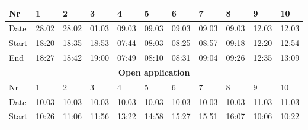 \begin{table}[H]
\begin{tabular}{|lllllllllll|}
\multicolumn{1}{|l|}{Nr} & \multicolumn{1}{l|}{1}     & \multicolumn{1}{l|}{2}     & \multicolumn{1}{l|}{3}     & \multicolumn{1}{l|}{4}     & \multicolumn{1}{l|}{5}     & \multicolumn{1}{l|}{6}     & \multicolumn{1}{l|}{7}     & \multicolumn{1}{l|}{8}     & \multicolumn{1}{l|}{9}     & 10    \\ \hline
\multicolumn{1}{|l|}{Date}   & \multicolumn{1}{l|}{28.02} & \multicolumn{1}{l|}{28.02} & \multicolumn{1}{l|}{01.03} & \multicolumn{1}{l|}{09.03} & \multicolumn{1}{l|}{09.03} & \multicolumn{1}{l|}{09.03} & \multicolumn{1}{l|}{09.03} & \multicolumn{1}{l|}{09.03} & \multicolumn{1}{l|}{12.03} & 12.03 \\ \hline
\multicolumn{1}{|l|}{Start}  & \multicolumn{1}{l|}{18:20} & \multicolumn{1}{l|}{18:35} & \multicolumn{1}{l|}{18:53} & \multicolumn{1}{l|}{07:44} & \multicolumn{1}{l|}{08:03} & \multicolumn{1}{l|}{08:25} & \multicolumn{1}{l|}{08:57} & \multicolumn{1}{l|}{09:18} & \multicolumn{1}{l|}{12:20} & 12:54 \\ \hline
\multicolumn{1}{|l|}{End}    & \multicolumn{1}{l|}{18:27} & \multicolumn{1}{l|}{18:42} & \multicolumn{1}{l|}{19:00} & \multicolumn{1}{l|}{07:49} & \multicolumn{1}{l|}{08:10} & \multicolumn{1}{l|}{08:31} & \multicolumn{1}{l|}{09:04} & \multicolumn{1}{l|}{09:26} & \multicolumn{1}{l|}{12:35} & 13:09 \\ \hline
\multicolumn{11}{|c|}{\textbf{Open application}}                                                                                                                                                                                                                                                          \\ \hline
\multicolumn{1}{|l|}{Nr} & \multicolumn{1}{l|}{1}     & \multicolumn{1}{l|}{2}     & \multicolumn{1}{l|}{3}     & \multicolumn{1}{l|}{4}     & \multicolumn{1}{l|}{5}     & \multicolumn{1}{l|}{6}     & \multicolumn{1}{l|}{7}     & \multicolumn{1}{l|}{8}     & \multicolumn{1}{l|}{9}     & 10    \\ \hline
\multicolumn{1}{|l|}{Date}   & \multicolumn{1}{l|}{10.03} & \multicolumn{1}{l|}{10.03} & \multicolumn{1}{l|}{10.03} & \multicolumn{1}{l|}{10.03} & \multicolumn{1}{l|}{10.03} & \multicolumn{1}{l|}{10.03} & \multicolumn{1}{l|}{10.03} & \multicolumn{1}{l|}{10.03} & \multicolumn{1}{l|}{11.03} & 11.03 \\ \hline
\multicolumn{1}{|l|}{Start}  & \multicolumn{1}{l|}{10:26} & \multicolumn{1}{l|}{11:06} & \multicolumn{1}{l|}{11:56} & \multicolumn{1}{l|}{13:22} & \multicolumn{1}{l|}{14:58} & \multicolumn{1}{l|}{15:27} & \multicolumn{1}{l|}{15:51} & \multicolumn{1}{l|}{16:07} & \multicolumn{1}{l|}{10:06} & 10:22 \\ \hline

\end{tabular}
\end{table}

